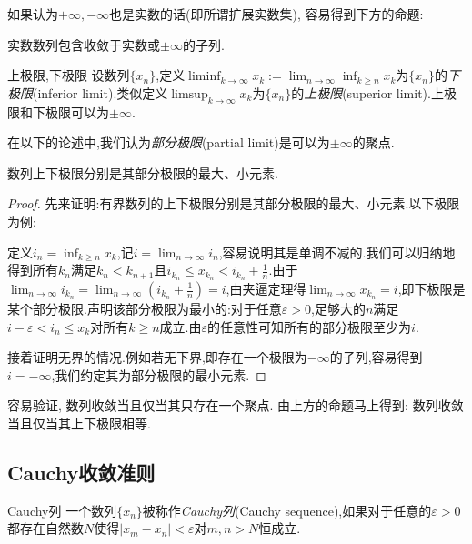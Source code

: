 如果认为$+\infty ,-\infty$也是实数的话(即所谓扩展实数集), 容易得到下方的命题:

\begin{proposition}{}
	实数数列包含收敛于实数或$\pm \infty$的子列.
\end{proposition}

\begin{definition}{上极限,下极限}
	设数列$\{ x_n \}$,定义$\liminf_{k\to \infty} x_k:=\lim_{n\to \infty} \inf_{k \geq n} x_k$为$\{ x_n \}$的\textit{下极限}(inferior limit).类似定义$\limsup_{k\to \infty} x_k$为$\{ x_n \}$的\textit{上极限}(superior limit).上极限和下极限可以为$\pm \infty$.
\end{definition}

在以下的论述中,我们认为\textit{部分极限}(partial limit)是可以为$\pm \infty$的聚点.

\begin{proposition}{}
	数列上下极限分别是其部分极限的最大、小元素.
\end{proposition}
\begin{proof}
	先来证明:有界数列的上下极限分别是其部分极限的最大、小元素.以下极限为例:
	
	定义$i_n=\inf_{k\geq n}x_k$,记$i=\lim_{n\to \infty} i_{n}$,容易说明其是单调不减的.我们可以归纳地得到所有$k_n$满足$k_n<k_{n+1}$且$i_{k_n} \leq x_{k_n} < i_{k_n}+\frac{1}{n}$.由于$\lim_{n\to \infty} i_{k_n} = \lim_{n\to \infty} (i_{k_n}+\frac{1}{n} ) = i$,由夹逼定理得$\lim_{n\to \infty} x_{k_n}=i$,即下极限是某个部分极限.声明该部分极限为最小的:对于任意$\varepsilon >0$,足够大的$n$满足$i-\varepsilon < i_n \leq x_k$对所有$k \geq n$成立.由$\varepsilon$的任意性可知所有的部分极限至少为$i$.
	
	接着证明无界的情况.例如若无下界,即存在一个极限为$-\infty$的子列,容易得到$i=-\infty$,我们约定其为部分极限的最小元素.
\end{proof}

容易验证, 数列收敛当且仅当其只存在一个聚点. 由上方的命题马上得到: 数列收敛当且仅当其上下极限相等. 

\subsection{Cauchy收敛准则}

\begin{definition}{Cauchy列}
	一个数列$\{ x_n \}$被称作\textit{Cauchy列}(Cauchy sequence),如果对于任意的$\varepsilon >0$都存在自然数$N$使得$|x_m-x_n|<\varepsilon$对$m,n>N$恒成立.
\end{definition}

